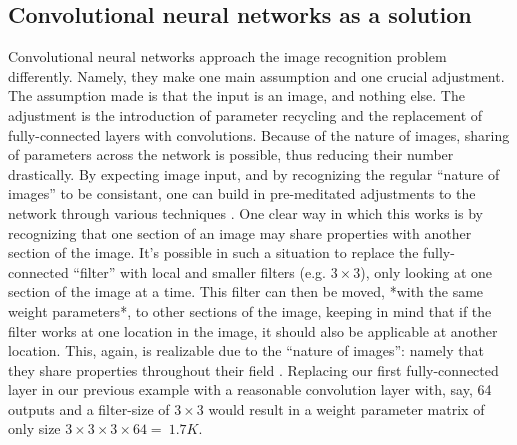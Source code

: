\subsection{Convolutional neural networks as a solution}
Convolutional neural networks approach the image recognition problem differently. Namely, they make one main assumption and one crucial adjustment. The assumption made is that the input is an image, and nothing else. The adjustment is the introduction of parameter recycling and the replacement of fully-connected layers with convolutions. Because of the nature of images, sharing of parameters across the network is possible, thus reducing their number drastically. By expecting image input, and by recognizing the regular ``nature of images'' to be consistant, one can build in pre-meditated adjustments to the network through various techniques \cite{convnets}. One clear way in which this works is by recognizing that one section of an image may share properties with another section of the image. It's possible in such a situation to replace the fully-connected ``filter'' with local and smaller filters (e.g. $3\times3$), only looking at one section of the image at a time. This filter can then be moved, *with the same weight parameters*, to other sections of the image, keeping in mind that if the filter works at one location in the image, it should also be applicable at another location. This, again, is realizable due to the ``nature of images'': namely that they share properties throughout their field \cite{convnets}. Replacing our first fully-connected layer in our previous example with a reasonable convolution layer with, say, 64 outputs and a filter-size of $3\times3$ would result in a weight parameter matrix of only size $3\times3\times3\times64 = ~1.7K$.

\label{fig:cnn}

